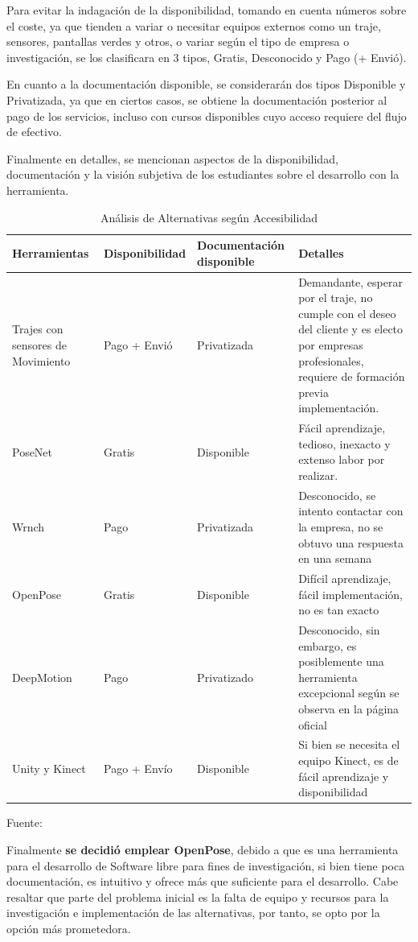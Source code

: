 Para evitar la indagación de la disponibilidad, tomando en cuenta números sobre el coste, ya que tienden a variar o necesitar equipos externos como un traje, sensores, pantallas verdes y otros, o variar según el tipo de empresa o investigación, se los clasificara en 3 tipos, Gratis, Desconocido y Pago (+ Envió).

En cuanto a la documentación disponible, se considerarán dos tipos Disponible y Privatizada, ya que en ciertos casos, se obtiene la documentación posterior al pago de los servicios, incluso con cursos disponibles cuyo acceso requiere del flujo de efectivo. 

Finalmente en detalles, se mencionan aspectos de la disponibilidad, documentación y la visión subjetiva de los estudiantes sobre el desarrollo con la herramienta.
\begin{table}[t]
	\begin{center}
		\begin{tabular}{| m{2.7cm} | m{2.5cm} | m{2.7cm} | m{9cm} |}
			\hline Herramientas & Disponibilidad & Documentación disponible & Detalles \\ \hline
			Trajes con sensores de Movimiento & Pago + Envió & Privatizada & Demandante, esperar por el traje, no cumple con el deseo del cliente y es electo por empresas profesionales, requiere de formación previa implementación.  \\ \hline
			PoseNet & Gratis & Disponible &  Fácil aprendizaje, tedioso, inexacto y extenso labor por realizar. \\ \hline
			Wrnch & Pago & Privatizada &  Desconocido, se intento contactar con la empresa, no se obtuvo una respuesta en una semana \\ \hline
			OpenPose & Gratis & Disponible &  Difícil aprendizaje, fácil implementación, no es tan exacto \\ \hline
			DeepMotion & Pago & Privatizado & Desconocido, sin embargo, es posiblemente una herramienta excepcional según se observa en la página oficial \\ \hline
			Unity y Kinect & Pago + Envío & Disponible & Si bien se necesita el equipo Kinect, es de fácil aprendizaje y disponibilidad  \\ \hline
		\end{tabular}
		\caption{Análisis de Alternativas según Accesibilidad}
		\footnotesize Fuente:\cite{8765346}
	\end{center}
\end{table}

Finalmente \textbf{se decidió emplear OpenPose}, debido a que es una herramienta para el desarrollo de Software libre para fines de investigación, si bien tiene poca documentación, es intuitivo y ofrece más que suficiente para el desarrollo. Cabe resaltar que parte del problema inicial es la falta de equipo y recursos para la investigación e implementación de las alternativas, por tanto, se opto por la opción más prometedora.







